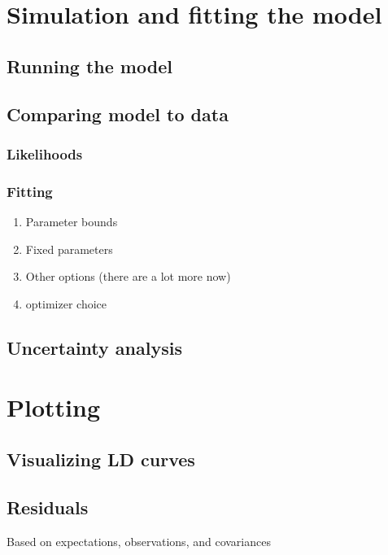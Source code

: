 \documentclass[11pt]{article}
\begin{document}
\clearpage

\section{Simulation and fitting the model}

\subsection{Running the model}

\subsection{Comparing model to data}

\subsubsection{Likelihoods}


\subsubsection{Fitting}

\begin{enumerate}
\item Parameter bounds
\item Fixed parameters
\item Other options (there are a lot more now)
\item optimizer choice
\end{enumerate}

\subsection{Uncertainty analysis}


\section{Plotting}

\subsection{Visualizing LD curves}


\subsection{Residuals}
Based on expectations, observations, and covariances
\end{document}
